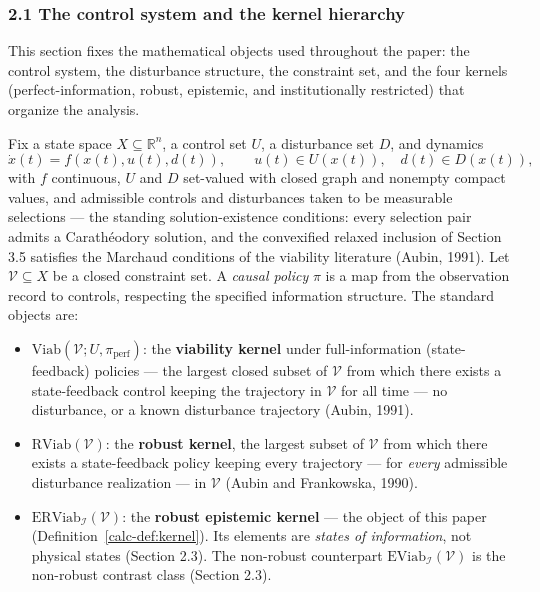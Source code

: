 \documentclass[10pt,twocolumn]{article}
\theoremstyle{definition}
\providecommand{\tightlist}{\setlength{\itemsep}{0pt}\setlength{\parskip}{0pt}}
\begin{document}
\subsubsection{2.1 The control system and the kernel
hierarchy}\label{calc-the-control-system-and-the-kernel-hierarchy}

This section fixes the mathematical objects used throughout the paper:
the control system, the disturbance structure, the constraint set, and
the four kernels (perfect-information, robust, epistemic, and
institutionally restricted) that organize the analysis.

Fix a state space \(X \subseteq \mathbb{R}^n\), a control set \(U\), a
disturbance set \(D\), and dynamics
\[\dot x(t) = f(x(t), u(t), d(t)), \qquad u(t) \in U(x(t)), \quad d(t) \in D(x(t)),\]
with \(f\) continuous, \(U\) and \(D\) set-valued with closed graph and
nonempty compact values, and admissible controls and disturbances taken
to be measurable selections --- the standing solution-existence conditions:
every selection pair admits a Carath\'eodory solution, and the
convexified relaxed inclusion of Section 3.5 satisfies the Marchaud
conditions of the viability literature (Aubin, 1991). Let \(\mathcal{V} \subseteq X\) be a closed
constraint set. A \emph{causal policy} \(\pi\) is a map from the
observation record to controls, respecting the specified information structure. The standard objects are:

\begin{itemize}
\tightlist
\item
  \(\mathrm{Viab}(\mathcal{V}; U, \pi_{\mathrm{perf}})\): the
  \textbf{viability kernel} under full-information (state-feedback)
  policies --- the largest closed subset of \(\mathcal{V}\) from which
  there exists a state-feedback control keeping the trajectory in
  \(\mathcal{V}\) for all time --- no disturbance, or a known
  disturbance trajectory (Aubin, 1991).
\item
  \(\mathrm{RViab}(\mathcal{V})\): the \textbf{robust kernel}, the
  largest subset of \(\mathcal{V}\) from which there exists a
  state-feedback policy keeping every trajectory --- for \emph{every}
  admissible disturbance realization --- in \(\mathcal{V}\) (Aubin and
  Frankowska, 1990).
\item
  \(\mathrm{ERViab}_{\mathcal{I}}(\mathcal{V})\): the \textbf{robust
  epistemic kernel} --- the object of this paper (Definition~\ref{calc-def:kernel}). Its
  elements are \emph{states of information}, not physical states
  (Section 2.3). The non-robust counterpart
  \(\mathrm{EViab}_{\mathcal{I}}(\mathcal{V})\) is the non-robust contrast class (Section 2.3).
\end{itemize}
\end{document}
